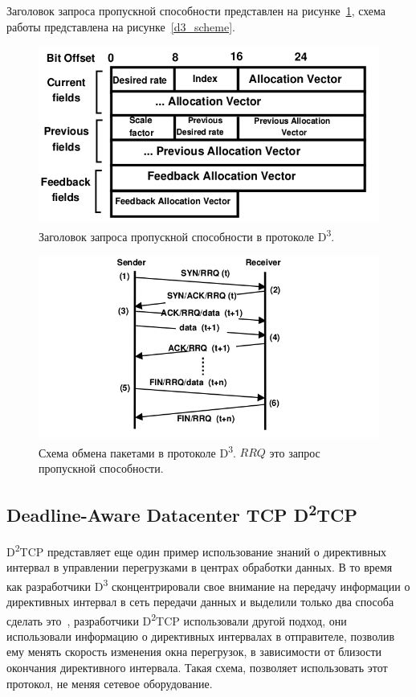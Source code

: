\documentclass[14pt, a4paper,oneside]{extarticle}
\begin{document}
Заголовок запроса пропускной способности представлен на рисунке~\ref{header}, схема работы представлена на рисунке~\ref{d3_scheme}.
\begin{figure}
\includegraphics[width=0.7\linewidth]{header}
\caption{Заголовок запроса пропускной способности в протоколе D\textsuperscript{3}.}
\label{header}
\end{figure}
\begin{figure}
\includegraphics[width=\linewidth]{d3_sheme}
\caption{Схема обмена пакетами в протоколе D\textsuperscript{3}. $RRQ$ это запрос пропускной способности.}
\label{d3_sheme}
\end{figure}


\subsection{Deadline-Aware Datacenter TCP D\textsuperscript{2}TCP}

D\textsuperscript{2}TCP представляет еще один пример использование знаний о директивных интервал в управлении перегрузками в центрах обработки данных. В то время как разработчики D\textsuperscript{3} сконцентрировали свое внимание на передачу информации о директивных интервал в сеть передачи данных и выделили только два способа сделать это~\cite{d3tcp}, разработчики D\textsuperscript{2}TCP использовали другой подход, они использовали информацию о директивных интервалах в отправителе, позволив ему менять скорость изменения окна перегрузок, в зависимости от близости окончания директивного интервала. Такая схема, позволяет использовать этот протокол, не меняя сетевое оборудование.
\end{document}
